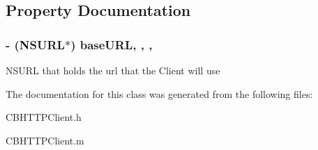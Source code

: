 \subsection{Property Documentation}
\hypertarget{interface_c_b_h_t_t_p_client_a9052e80b6482a3e1242f061b5f412df6}{
\subsubsection[{base\-U\-R\-L}]{\setlength{\rightskip}{0pt plus 5cm}-\/ (N\-S\-U\-R\-L$\ast$) base\-U\-R\-L\hspace{0.3cm}{\ttfamily [read]}, {\ttfamily [write]}, {\ttfamily [nonatomic]}, {\ttfamily [strong]}}}\label{interface_c_b_h_t_t_p_client_a9052e80b6482a3e1242f061b5f412df6}
N\-S\-U\-R\-L that holds the url that the Client will use 

The documentation for this class was generated from the following files\-:\begin{DoxyCompactItemize}
\item 
C\-B\-H\-T\-T\-P\-Client.\-h\item 
C\-B\-H\-T\-T\-P\-Client.\-m\end{DoxyCompactItemize}
